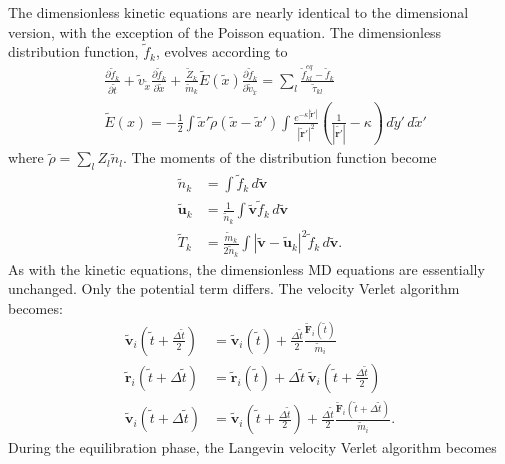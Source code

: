 \documentclass{article}
\begin{document}
The dimensionless kinetic equations are nearly identical to the dimensional version, with the exception of the Poisson equation. The dimensionless distribution function, $\tilde{f}_k$, evolves according to
\begin{align*}
&\frac{\partial \tilde{f}_k}{\partial \tilde{t}}+\tilde{v}_{\tilde{x}}\frac{\partial \tilde{f}_k}{\partial \tilde{x}}+\frac{\tilde{Z}_k}{\tilde{m}_k}\tilde{E}(\tilde{x})\frac{\partial \tilde{f}_k}{\partial \tilde{v}_{\tilde{x}}}=\sum_l\frac{\tilde{f}_{kl}^{eq}-\tilde{f}_k}{\tilde{\tau}_{kl}}\\
&\tilde{E}(x) = -\frac{1}{2}\int\tilde{x}'\tilde{\rho}(\tilde{x}-\tilde{x}')\int\frac{e^{-\kappa|\tilde{\mathbf{r}}'|}}{|\tilde{\mathbf{r}}'|^2}\left(\frac{1}{|\tilde{\mathbf{r'}}|}-\kappa\right)\,d\tilde{y}'\,d\tilde{x}'
\end{align*}
where $\tilde{\rho} = \sum_{l}Z_l\tilde{n}_l$. The moments of the distribution function become
\begin{align*}
\tilde{n}_k &= \int\tilde{f}_k\,d\tilde{\mathbf{v}} \\
\tilde{\mathbf{u}}_k &= \frac{1}{\tilde{n}_k}\int\tilde{\mathbf{v}}\tilde{f}_k\,d\tilde{\mathbf{v}} \\
\tilde{T}_k &= \frac{\tilde{m}_k}{2\tilde{n}_k}\int\left|\tilde{\mathbf{v}}-\tilde{\mathbf{u}}_k\right|^2\tilde{f}_k\,d\tilde{\mathbf{v}}.
\end{align*}
As with the kinetic equations, the dimensionless MD equations are essentially unchanged. Only the potential term differs. The velocity Verlet algorithm becomes:
\begin{align*}
\tilde{\mathbf{v}}_i\left(\tilde{t}+\frac{\Delta\tilde{t}}{2}\right) &= \tilde{\mathbf{v}}_i(\tilde{t}) + \frac{\Delta\tilde{t}}{2}\frac{\tilde{\mathbf{F}}_i(\tilde{t})}{\tilde{m}_i} \\
\tilde{\mathbf{r}}_i(\tilde{t}+\Delta\tilde{t}) &= \tilde{\mathbf{r}}_i(\tilde{t}) + \Delta\tilde{t}\:\tilde{\mathbf{v}}_i\left(\tilde{t}+\frac{\Delta\tilde{t}}{2}\right) \\
\tilde{\mathbf{v}}_i(\tilde{t}+\Delta\tilde{t}) &= \tilde{\mathbf{v}}_i\left(\tilde{t}+\frac{\Delta\tilde{t}}{2}\right) + \frac{\Delta\tilde{t}}{2}\frac{\tilde{\mathbf{F}}_i(\tilde{t}+\Delta\tilde{t})}{\tilde{m}_i}.
\end{align*}
During the equilibration phase, the Langevin velocity Verlet algorithm becomes
\end{document}
